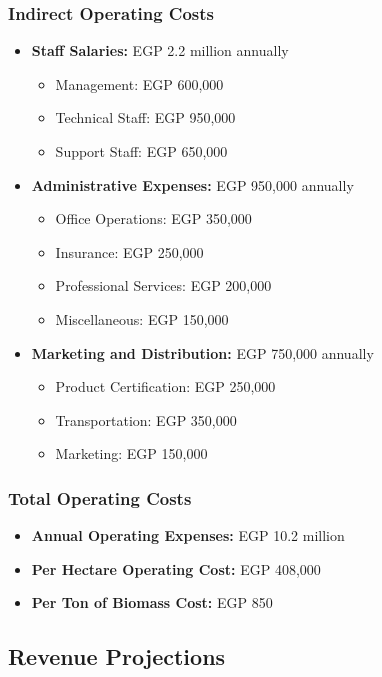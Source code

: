 \subsubsection{Indirect Operating Costs}
\begin{itemize}
    \item \textbf{Staff Salaries:} EGP 2.2 million annually
    \begin{itemize}
        \item Management: EGP 600,000
        \item Technical Staff: EGP 950,000
        \item Support Staff: EGP 650,000
    \end{itemize}
    
    \item \textbf{Administrative Expenses:} EGP 950,000 annually
    \begin{itemize}
        \item Office Operations: EGP 350,000
        \item Insurance: EGP 250,000
        \item Professional Services: EGP 200,000
        \item Miscellaneous: EGP 150,000
    \end{itemize}
    
    \item \textbf{Marketing and Distribution:} EGP 750,000 annually
    \begin{itemize}
        \item Product Certification: EGP 250,000
        \item Transportation: EGP 350,000
        \item Marketing: EGP 150,000
    \end{itemize}
\end{itemize}

\subsubsection{Total Operating Costs}
\begin{itemize}
    \item \textbf{Annual Operating Expenses:} EGP 10.2 million
    \item \textbf{Per Hectare Operating Cost:} EGP 408,000
    \item \textbf{Per Ton of Biomass Cost:} EGP 850
\end{itemize}

\subsection{Revenue Projections}

